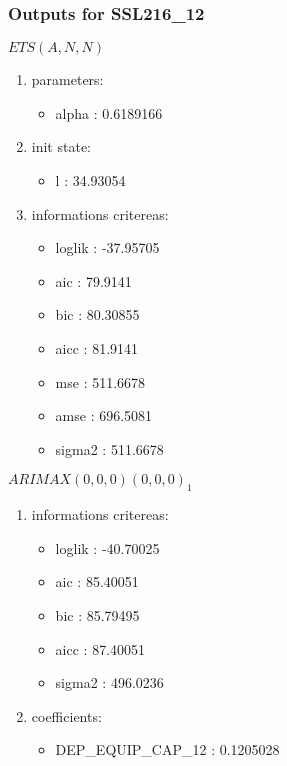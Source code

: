 \documentclass[10pt,a4paper]{article}\usepackage[]{graphicx}\usepackage[]{color}
\newcommand{\AaA}{\_}
\begin{document}
\subsubsection{Outputs for SSL216\AaA 12}
\begin{multicols}{2}


$ ETS(A,N,N) $
\begin{enumerate}
\item parameters:
\begin{itemize}
\item  alpha :  0.6189166 
\end{itemize}
\item init state:
\begin{itemize}
\item  l :  34.93054 
\end{itemize}
\item informations critereas:
\begin{itemize}
\item  loglik :  -37.95705 
\item  aic :  79.9141 
\item  bic :  80.30855 
\item  aicc :  81.9141 
\item  mse :  511.6678 
\item  amse :  696.5081 
\item  sigma2 :  511.6678 
\end{itemize}
\end{enumerate}

\columnbreak


 $ARIMAX(0,0,0)(0,0,0)_{1}$ 
\begin{enumerate}
\item informations critereas:
\begin{itemize}
\item  loglik :  -40.70025 
\item  aic :  85.40051 
\item  bic :  85.79495 
\item  aicc :  87.40051 
\item  sigma2 :  496.0236 
\end{itemize}

\item coefficients:
\begin{itemize}
\item  DEP\AaA EQUIP\AaA CAP\AaA 12 :  0.1205028 
\end{itemize}
\end{enumerate}
\end{multicols}
\end{document}

